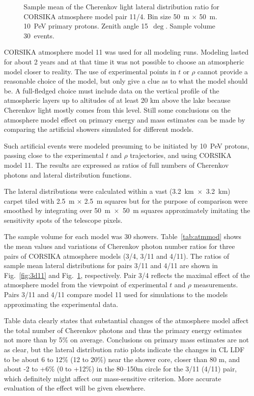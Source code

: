 \documentclass[final,5p,times,twocolumn]{elsarticle}
\begin{document}
\begin{figure}[tb]
\begin{minipage}[t]{0.48\textwidth}
    \vspace{-1.0pc}
    \caption{Sample mean of the Cherenkov light lateral distribution ratio for CORSIKA atmosphere model pair 11/4. Bin size 50~m $\times$ 50~m. 10~PeV primary protons. Zenith angle 15~$\deg$. Sample volume 30~events.}
\label{fig:4d11}
\end{minipage}
\end{figure}


CORSIKA atmosphere model 11 was used for all modeling runs. Modeling lasted for about 2 years and at that time it was not possible to choose an atmospheric model closer to reality. The use of  experimental points in $t$ or $\rho$ cannot provide a reasonable choice of the model, but only give a clue as to what the model should be. A full-fledged choice must include data on the vertical profile of the atmospheric layers up to altitudes of at least 20 km above the lake because Cherenkov light mostly comes from this level. Still some conclusions on the atmosphere model effect on primary energy and mass estimates can be made by comparing the artificial showers simulated for different models.

Such artificial events were modeled presuming to be initiated by 10~PeV protons, passing close to the experimental $t$ and $\rho$ trajectories, and using CORSIKA model 11. The results are expressed as ratios of full numbers of Cherenkov photons and lateral distribution functions.

The lateral distributions were calculated within a vast (3.2~km~$\times$~3.2~km) carpet tiled with 2.5~m $\times$ 2.5~m squares but for the purpose of comparison were smoothed by integrating over 50~m~$\times$~50~m squares approximately imitating the sensitivity spots of the telescope pixels.

The sample volume for each model was 30 showers. Table~\ref{tab:atmmod} shows the mean values and variations of Cherenkov photon number ratios for three pairs of CORSIKA atmosphere models (3/4, 3/11 and 4/11). The ratios of sample mean lateral distributions for pairs 3/11 and 4/11 are shown in Fig.~\ref{fig:3d11} and Fig.~\ref{fig:4d11}, respectively. Pair 3/4 reflects the maximal effect of the atmosphere model from the viewpoint of experimental $t$ and $\rho$ measurements. Pairs 3/11 and 4/11 compare model 11 used for simulations to the models approximating the experimental data.

Table data clearly states that substantial changes of the atmosphere model affect the total number of Cherenkov photons and thus the primary energy estimates not more than by 5\% on average. Conclusions on primary mass estimates are not as clear, but the lateral distribution ratio plots indicate the changes in CL LDF to be about 6 to 12\% (12 to 20\%) near the shower core, closer than 80 m, and about -2 to +6\% (0 to +12\%) in the 80--150m circle for the 3/11 (4/11) pair, which definitely might affect our mass-sensitive criterion. More accurate evaluation of the effect will be given elsewhere.
\end{document}
